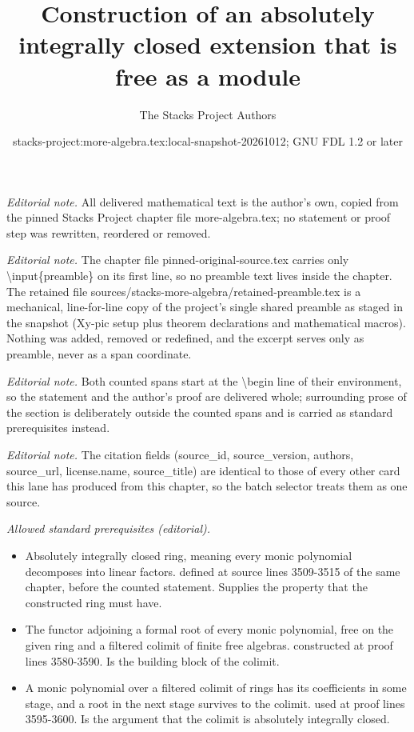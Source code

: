 \documentclass[10pt,a4paper]{amsart}
\title{Construction of an absolutely integrally closed extension that is free as a module}
\author{The Stacks Project Authors}
\date{stacks-project:more-algebra.tex:local-snapshot-20261012; GNU FDL 1.2 or later}
\theoremstyle{plain}
\theoremstyle{definition}
\theoremstyle{remark}
\numberwithin{equation}{subsection}
\begin{document}
\maketitle
\setcounter{subsection}{1}
\noindent\textit{Editorial note.} All delivered mathematical text is the author's own, copied from the pinned Stacks Project chapter file more-algebra.tex; no statement or proof step was rewritten, reordered or removed.\par\medskip
\noindent\textit{Editorial note.} The chapter file pinned-original-source.tex carries only \textbackslash{}input\{preamble\} on its first line, so no preamble text lives inside the chapter. The retained file sources/stacks-more-algebra/retained-preamble.tex is a mechanical, line-for-line copy of the project's single shared preamble as staged in the snapshot (Xy-pic setup plus theorem declarations and mathematical macros). Nothing was added, removed or redefined, and the excerpt serves only as preamble, never as a span coordinate.\par\medskip
\noindent\textit{Editorial note.} Both counted spans start at the \textbackslash{}begin line of their environment, so the statement and the author's proof are delivered whole; surrounding prose of the section is deliberately outside the counted spans and is carried as standard prerequisites instead.\par\medskip
\noindent\textit{Editorial note.} The citation fields (source\_id, source\_version, authors, source\_url, license.name, source\_title) are identical to those of every other card this lane has produced from this chapter, so the batch selector treats them as one source.\par\medskip
\noindent\textit{Allowed standard prerequisites (editorial).}\begin{itemize}
\item Absolutely integrally closed ring, meaning every monic polynomial decomposes into linear factors. defined at source lines 3509-3515 of the same chapter, before the counted statement. Supplies the property that the constructed ring must have.
\item The functor adjoining a formal root of every monic polynomial, free on the given ring and a filtered colimit of finite free algebras. constructed at proof lines 3580-3590. Is the building block of the colimit.
\item A monic polynomial over a filtered colimit of rings has its coefficients in some stage, and a root in the next stage survives to the colimit. used at proof lines 3595-3600. Is the argument that the colimit is absolutely integrally closed.
\end{itemize}\medskip
\end{document}
